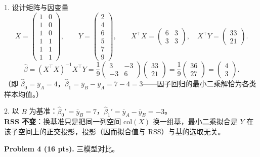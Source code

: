 \documentclass[11pt]{ctexart}
\newcommand{\ans}[1]{{\color{red}#1}}
\begin{document}
\ans{
1. 设计矩阵与因变量
\[
X = \begin{pmatrix} 1 & 0 \\ 1 & 0 \\ 1 & 0 \\ 1 & 1 \\ 1 & 1 \\ 1 & 1 \end{pmatrix}, \qquad Y = \begin{pmatrix} 2 \\ 4 \\ 6 \\ 5 \\ 7 \\ 9 \end{pmatrix}, \qquad
X^{\top}X = \begin{pmatrix} 6 & 3 \\ 3 & 3 \end{pmatrix},\quad X^{\top}Y = \begin{pmatrix} 33 \\ 21 \end{pmatrix}.
\]
\[
\hat\beta = (X^{\top}X)^{-1}X^{\top}Y = \frac{1}{9}\begin{pmatrix} 3 & -3 \\ -3 & 6 \end{pmatrix}\begin{pmatrix} 33 \\ 21 \end{pmatrix} = \frac{1}{9}\begin{pmatrix} 36 \\ 27 \end{pmatrix} = \begin{pmatrix} 4 \\ 3 \end{pmatrix}.
\]
（即 $\hat\beta_0 = \bar{y}_A = 4$，$\hat\beta_1 = \bar{y}_B - \bar{y}_A = 7 - 4 = 3$——因子回归的最小二乘解恰为各类样本均值。）

2. 以 $B$ 为基准：$\hat\beta_0' = \bar{y}_B = 7$，$\hat\beta_1' = \bar{y}_A - \bar{y}_B = -3$。\\
\textbf{RSS 不变}：换基准只是把同一列空间 $\mathrm{col}(X)$ 换一组基，最小二乘拟合是 $Y$ 在该子空间上的正交投影，投影（因而拟合值与 RSS）与基的选取无关。
}

\noindent\textbf{Problem 4 (16 pts).} 三模型对比。
\end{document}
